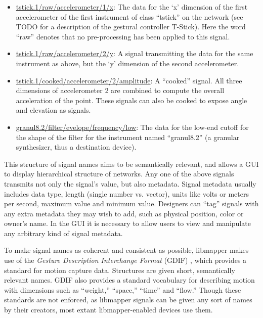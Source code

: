 	\begin{itemize}
	\item\url{tstick.1/raw/accelerometer/1/x}: The data for the `x' dimension of the first accelerometer of the first instrument of class ``tstick'' on the network (see TODO for a description of the gestural controller T-Stick). Here the word ``raw'' denotes that no pre-processing has been applied to this signal. 
	\item\url{tstick.1/raw/accelerometer/2/y}: A signal transmitting the data for the same instrument as above, but the `y' dimension of the second accelerometer.
	\item\url{tstick.1/cooked/accelerometer/2/amplitude}: A ``cooked'' signal. All three dimensions of accelerometer 2 are combined to compute the overall acceleration of the point. These signals can also be cooked to expose angle and elevation as signals.
	\item\url{granul8.2/filter/evelope/frequency/low}: The data for the low-end cutoff for the shape of the filter for the instrument named ``granul8.2'' (a granular synthesizer, thus a destination device).
	\end{itemize}

This structure of signal names aims to be semantically relevant, and allows a GUI to display hierarchical structure of networks. Any one of the above signals transmits not only the signal's value, but also metadata. Signal metadata usually includes data type, length (single number vs. vector), units like volts or meters per second, maximum value and minimum value. Designers can ``tag'' signals with any extra metadata they may wish to add, such as physical position, color or owner's name. In the GUI it is necessary to allow users to view and manipulate any arbitrary kind of signal metadata.

To make signal names as coherent and consistent as possible, libmapper makes use of the \emph{Gesture Description Interchange Format} (GDIF) , which provides a standard for motion capture data. Structures are given short, semantically relevant names. GDIF also provides a standard vocabulary for describing motion with dimensions such as ``weight,'' ``space,'' ``time'' and ``flow.'' Though these standards are not enforced, as libmapper signals can be given any sort of names by their creators, most extant libmapper-enabled devices use them.


